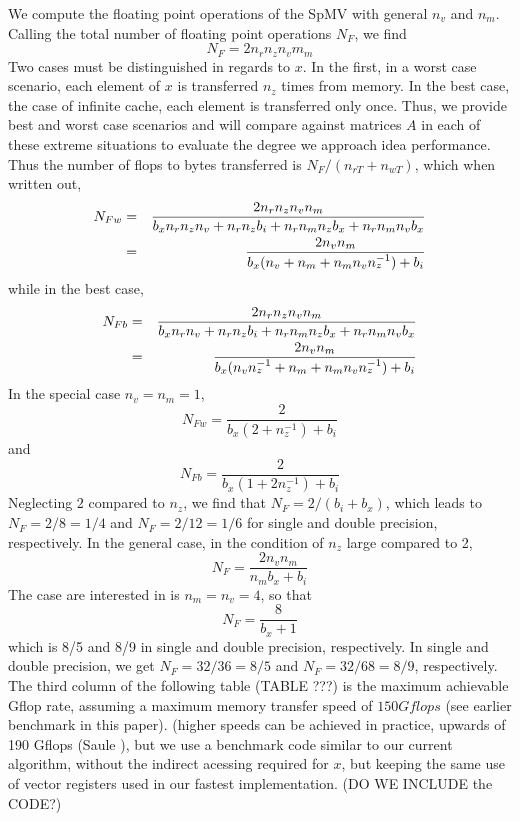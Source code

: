 \documentclass[10pt, conference, compsocconf]{IEEEtran}
\begin{document}
We compute the floating point operations of the SpMV with general $n_v$ and $n_m$. Calling the total number of floating point operations $N_F$, we find
$$
  N_F = 2 n_r n_z n_v m_m
$$
Two cases must be distinguished in regards to $x$. In the first, in a worst case scenario, each element 
of $x$ is transferred $n_z$ times from memory. In the best case, the case of infinite cache, each element is transferred only once. Thus, we provide best and worst case scenarios and will compare against matrices $A$
in each of these extreme situations to evaluate the degree we approach idea performance. 
Thus the number of flops to bytes transferred is $N_F / (n_{rT} + n_{wT})$, which when written out, 
\begin{eqnarray}
N_{Fw} &=& \frac{2 n_r n_z n_v n_m}{b_x n_r n_z n_v  + n_r n_z b_i + n_r n_m n_z b_x + n_r n_m n_v b_x} \nonumber \\
    &=& \frac{2 n_v n_m}{b_x ( n_v + n_m + n_m n_v n_z^{-1}) + b_i}  \nonumber \\
\end{eqnarray}
while in the best case, 
\begin{eqnarray}
N_{Fb} &=& \frac{2 n_r n_z n_v n_m}{b_x n_r n_v  + n_r n_z b_i + n_r n_m n_z b_x + n_r n_m n_v b_x} \nonumber \\
    &=& \frac{2 n_v n_m}{b_x ( n_v n_z^{-1} + n_m  + n_m n_v n_z^{-1}) + b_i } 
\end{eqnarray}
In the special case $n_v=n_m=1$, 
$$
N_{Fw} = \frac{2}{b_x (2+n_z^{-1}) + b_i}
$$
and 
$$
N_{Fb} = \frac{2}{b_x (1 + 2 n_z^{-1}) + b_i}
$$
Neglecting $2$ compared to $n_z$, we find that $N_F = 2/(b_i+b_x)$, which leads to 
$N_F = 2/8=1/4$ and  $N_F=2/12=1/6$ for single and double precision, respectively. 
In the general case, in the condition of $n_z$ large compared to 2, 
$$
N_F =  \frac{2 n_v n_m}{n_m b_x + b_i}
$$ 
The case are interested in is $n_m=n_v=4$, so that
$$
N_F = \frac{8}{ b_x + 1}
$$
which is 8/5 and 8/9 in single and double precision, respectively. 
In single and double precision, we get $N_F=32/36=8/5$ and $N_F=32/68=8/9$, respectively.
The third column of the following table (TABLE ???) is the maximum achievable Gflop rate, assuming 
a maximum memory transfer speed of $150 Gflops$ (see earlier benchmark in this paper). 
(higher speeds can be achieved in practice,  upwards of 190 Gflops (Saule \etal\cite{}), but we use
a benchmark code similar to our current algorithm, without the indirect acessing required for $x$, but keeping the same use of vector registers used in our fastest implementation. (DO WE INCLUDE the CODE?)
\end{document}
